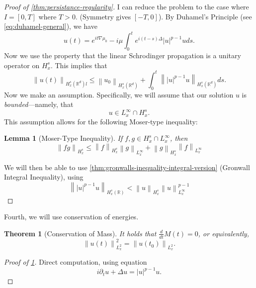 \documentclass{article}
\newtheorem{theorem}{Theorem}
\newtheorem{lemma}{Lemma}
\def\R{\mathbb{R}} %
\newcommand\norm[1]{\left\lVert#1\right\rVert}
\begin{document}
\begin{proof}[Proof of \cref{thm:persistance-regularity}]
  I can reduce the problem to the case where $I=[0,T]$ where $T>0$. (Symmetry
  gives $[-T,0]$). By Duhamel's Principle (see \cref{eq:duhamel-general}), we
  have
  \begin{equation*}
    u(t) 
    = e^{it\nabla \mu_{0}}- i\mu \int_{0}^{t}e^{i(t-s)\Delta}\left| u \right|^{p-1}uds.
  \end{equation*}
  Now we use the property that the linear Schrodinger propagation is a unitary
  operator on $H^{s}_{x}$. This implies that
  \begin{equation*}
    \norm{u(t)}_{H^{s}_{x}(\R^d)l} 
    \leq
    \norm{u_{0}}_{H_{x}^{s}(\R^d)}
    + \int_{0}^{t} \norm{|u|^{p-1}u}_{H_{x}^{s}(\R^d)}ds. 
  \end{equation*}
  Now we make an assumption. Specifically, we will assume that our solution
  $u$ is \textit{bounded}---namely, that
  \begin{equation*}
    u\in  L_{x}^{\infty}\cap H^{s}_{x}.
  \end{equation*}
  This assumption allows for the following Moser-type inequality:
  \begin{lemma}[Moser-Type Inequality]
    \label{lem:moser-type-inequality}
    If $f,g\in H^{s}_{x}\cap L_{x}^{\infty}$,  then
    \begin{equation*}
      \norm{fg}_{H^{s}_{x}} 
      \leq \norm{f}_{H^{s}_{x}}\norm{g}_{L^{\infty}_{x}}
      + \norm{g}_{H^{s}_{x}}\norm{f}_{L^{\infty}_{x}}
    \end{equation*}
  \end{lemma}
  We will then be able to use \cref{thm:gronwalls-inequality-integral-version}
  (Gronwall Integral Inequality), using
  \begin{equation*}
    \norm{|u|^{p-1}u}_{H^{s}_{x}(\R)}< \norm{u}_{H^{s}_{x}}\norm{u}_{L_{x}^{\infty}}^{p-1}
  \end{equation*}
\end{proof}
Fourth, we will use conservation of energies.
\begin{theorem}[Conservation of Mass]
  \label{thm:conservation-mass}
  It holds that $\frac{d}{dt}M(t) = 0$, or equivalently,
  \begin{equation*}
    \norm{u(t)}_{L_{x}^{2}}^{2} = \norm{u(t_{0})}_{L_{x}^{2}}.
  \end{equation*}
\end{theorem}
\begin{proof}[Proof of \cref{thm:conservation-mass}]
  Direct computation, using equation
  \begin{equation*}
    i \partial_{t} u + \Delta u = |u|^{p-1}u.
  \end{equation*}
\end{proof}
\end{document}
